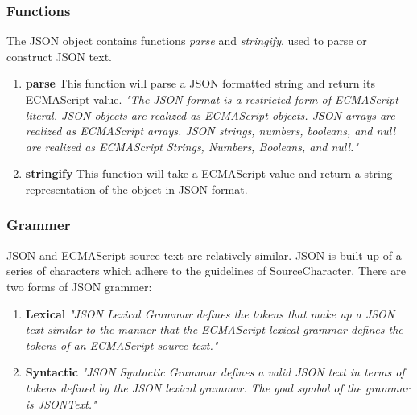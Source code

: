 \subsubsection{Functions}
The JSON object contains functions \emph{parse} and \emph{stringify}, used to parse or construct JSON text. 
\begin{enumerate}
\item \textbf{parse} This function will parse a JSON formatted string and return its ECMAScript value. \emph{"The JSON format is a restricted form of ECMAScript literal. JSON objects are realized as ECMAScript objects. JSON arrays are realized as ECMAScript arrays. JSON strings, numbers, booleans, and null are realized as ECMAScript Strings, Numbers, Booleans, and null."\cite{crockford}}
\item \textbf{stringify} This function will take a ECMAScript value and return a string representation of the object in JSON format. \cite{crockford}
\end{enumerate}
\subsubsection{Grammer}
JSON and ECMAScript source text are relatively similar. JSON is built up of a series of characters which adhere to the guidelines of SourceCharacter. There are two forms of JSON grammer:
\begin{enumerate}
\item \textbf{Lexical} \emph{"JSON Lexical Grammar defines the tokens that make up a JSON text similar to the manner that the ECMAScript lexical grammar defines the tokens of an ECMAScript source text."\cite{ecma}} 
\item \textbf{Syntactic} \emph{"JSON Syntactic Grammar defines a valid JSON text in terms of tokens defined by the JSON lexical grammar. The goal symbol of the grammar is JSONText."\cite{ecma}}
\end{enumerate}

